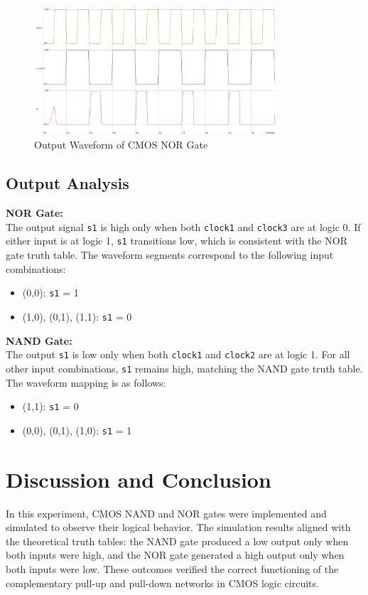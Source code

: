 \documentclass[12pt]{article}
\begin{document}
\begin{figure}[H]
    \centering
    \includegraphics[width=0.8\textwidth]{3Nor_tt.png}
    \caption{Output Waveform of CMOS NOR Gate}
\end{figure}

\subsection*{Output Analysis}

\textbf{NOR Gate:} \\
The output signal \texttt{s1} is high only when both \texttt{clock1} and \texttt{clock3} are at logic 0. If either input is at logic 1, \texttt{s1} transitions low, which is consistent with the NOR gate truth table. The waveform segments correspond to the following input combinations:
\begin{itemize}
    \item (0,0): \texttt{s1} = 1
    \item (1,0), (0,1), (1,1): \texttt{s1} = 0
\end{itemize}

\textbf{NAND Gate:} \\
The output \texttt{s1} is low only when both \texttt{clock1} and \texttt{clock2} are at logic 1. For all other input combinations, \texttt{s1} remains high, matching the NAND gate truth table. The waveform mapping is as follows:
\begin{itemize}
    \item (1,1): \texttt{s1} = 0
    \item (0,0), (0,1), (1,0): \texttt{s1} = 1
\end{itemize}

\section*{Discussion and Conclusion}
In this experiment, CMOS NAND and NOR gates were implemented and simulated to observe their logical behavior. The simulation results aligned with the theoretical truth tables: the NAND gate produced a low output only when both inputs were high, and the NOR gate generated a high output only when both inputs were low. These outcomes verified the correct functioning of the complementary pull-up and pull-down networks in CMOS logic circuits.
\end{document}
